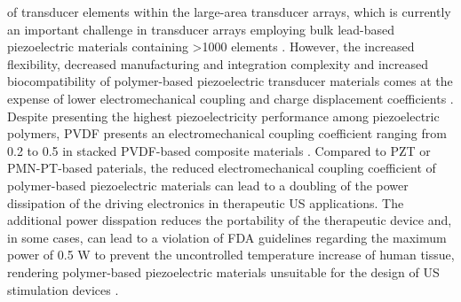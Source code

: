 of transducer elements within the large-area transducer arrays, which is currently an important challenge 
in transducer arrays employing bulk lead-based piezoelectric materials containing >1000 elements 
\cite{https://www.nature.com/articles/s41467-024-47074-1}. 
However, the increased flexibility, decreased manufacturing and integration complexity and increased 
biocompatibility of polymer-based piezoelectric transducer materials comes at the expense of 
lower electromechanical coupling and charge displacement coefficients \cite{https://doi.org/10.1016/j.ceramint.2021.03.054}.
Despite presenting the highest piezoelectricity performance among piezoelectric polymers, PVDF 
presents an electromechanical coupling coefficient ranging from 0.2 to 0.5 in stacked PVDF-based composite materials
\cite{https://doi.org/10.1016/j.jmbbm.2021.104669, https://doi.org/10.1002/adfm.201908724, https://doi.org/10.1007/978-0-387-76540-2_7}. 
Compared to PZT or PMN-PT-based paterials, the reduced electromechanical coupling coefficient of polymer-based 
piezoelectric materials can lead to a doubling of the power dissipation of the driving electronics 
in therapeutic US applications. The additional power disspation reduces the portability 
of the therapeutic device and, in some cases, can lead to a violation of FDA guidelines 
regarding the maximum power of 0.5 W to prevent the uncontrolled temperature increase of human tissue, 
rendering polymer-based piezoelectric materials unsuitable for the design of US stimulation devices \cite{Fomenko2018, Dalecki2004}.

